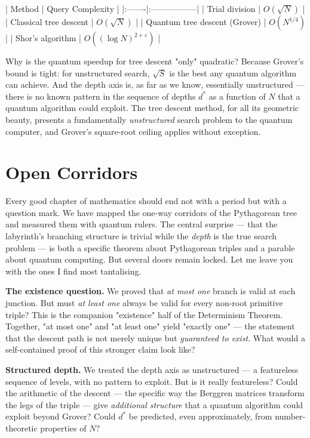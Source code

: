 \documentclass[11pt,twoside,openright]{book}
\theoremstyle{definition}
\theoremstyle{remark}
\begin{document}
| Method | Query Complexity |
|:-------|:-----------------|
| Trial division | $O(\sqrt{N})$ |
| Classical tree descent | $O(\sqrt{N})$ |
| Quantum tree descent (Grover) | $O(N^{1/4})$ |
| Shor's algorithm | $O((\log N)^{2+\varepsilon})$ |

Why is the quantum speedup for tree descent "only" quadratic? Because Grover's bound is tight: for unstructured search, $\sqrt{S}$ is the best any quantum algorithm can achieve. And the depth axis is, as far as we know, essentially unstructured --- there is no known pattern in the sequence of depths $d^*$ as a function of $N$ that a quantum algorithm could exploit. The tree descent method, for all its geometric beauty, presents a fundamentally \textit{unstructured} search problem to the quantum computer, and Grover's square-root ceiling applies without exception.



\section{Open Corridors}

Every good chapter of mathematics should end not with a period but with a question mark. We have mapped the one-way corridors of the Pythagorean tree and measured them with quantum rulers. The central surprise --- that the labyrinth's branching structure is trivial while the \textit{depth} is the true search problem --- is both a specific theorem about Pythagorean triples and a parable about quantum computing. But several doors remain locked. Let me leave you with the ones I find most tantalising.

\textbf{The existence question.} We proved that \textit{at most one} branch is valid at each junction. But must \textit{at least one} always be valid for every non-root primitive triple? This is the companion "existence" half of the Determinism Theorem. Together, "at most one" and "at least one" yield "exactly one" --- the statement that the descent path is not merely unique but \textit{guaranteed to exist}. What would a self-contained proof of this stronger claim look like?

\textbf{Structured depth.} We treated the depth axis as unstructured --- a featureless sequence of levels, with no pattern to exploit. But is it really featureless? Could the arithmetic of the descent --- the specific way the Berggren matrices transform the legs of the triple --- give \textit{additional structure} that a quantum algorithm could exploit beyond Grover? Could $d^*$ be predicted, even approximately, from number-theoretic properties of $N$?
\end{document}
